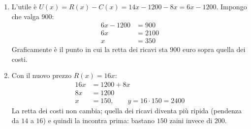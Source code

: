 \begin{question}[ID=4.5, subtitle={Break-even e utile desiderato}, difficulty=difficile, tags={sistemi, break-even, grafici}]
\begin{explanation}
\begin{enumerate}[label=\alph*),leftmargin=1.8cm]
\[\begin{aligned}
    6x &= 1200\\
    x &= 200\\
    y &= 14\cdot200=2800
    \end{aligned}\]
    Nel grafico la retta dei costi parte da $(0;\,1200)$, quella dei ricavi dall'origine; si incontrano in $B$.
    \item L'utile è $U(x)=R(x)-C(x)=14x-1200-8x=6x-1200$. Impongo che valga $900$:
    \[\begin{aligned}
    6x-1200 &= 900\\
    6x &= 2100\\
    x &= 350
    \end{aligned}\]
    Graficamente è il punto in cui la retta dei ricavi sta $900$ euro sopra quella dei costi.
    \item Con il nuovo prezzo $R(x)=16x$:
    \[\begin{aligned}
    16x &= 1200+8x\\
    8x &= 1200\\
    x &= 150, \qquad y=16\cdot150=2400
    \end{aligned}\]
    La retta dei costi non cambia; quella dei ricavi diventa più ripida (pendenza da $14$ a $16$) e quindi la incontra prima: bastano $150$ zaini invece di $200$.
\end{enumerate}
\end{explanation}
\end{question}
